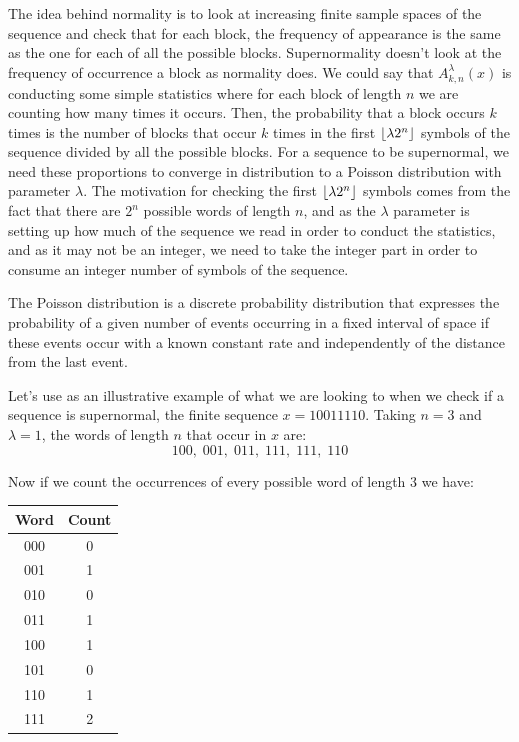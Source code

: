\documentclass[11pt,a4paper]{tesis}
\DeclarePairedDelimiter{\floor}{\lfloor}{\rfloor}
\begin{document}
The idea behind normality is to look at increasing finite sample spaces of the sequence and check that for each block, the frequency of appearance is the same as the one for each of all the possible blocks.
Supernormality doesn't look at the frequency of occurrence a block as normality does. We could say that $A^\lambda_{k,n}(x)$ is conducting some simple statistics where for each block of length $n$ we are counting how many times it occurs. 
 Then, the probability that a block occurs $k$ times is the number of blocks that occur $k$ times in the first $\floor{\lambda 2^n}$ symbols of the sequence divided by all the possible blocks.
For a sequence to be supernormal, we need these proportions to converge in distribution to a Poisson distribution with parameter $\lambda$. 
The motivation for checking the first $\floor{\lambda 2^n}$ symbols comes from the fact that there are $2^n$ possible words of length $n$, and as the $\lambda$ parameter is setting up how much of the sequence we read in order to conduct the statistics, and as it may not be an integer, we need to take the integer part in order to consume an integer number of symbols of the sequence.

The Poisson distribution is a discrete probability distribution that expresses the probability of a given number of events occurring in a fixed interval of space if these events occur with a known constant rate and independently of the distance from the last event.


Let's use as an illustrative example of what we are looking to when we check if a sequence is supernormal, the finite sequence $x = 10011110$. Taking $n=3$ and $\lambda = 1$, the words of length $n$ that occur in $x$ are:
$$100, \; 001, \; 011,\; 111,\; 111,\; 110$$

Now if we count the occurrences of every possible word of length $3$ we have:

\begin{center}
    \begin{tabular}{|c | c|} 
    \hline
    Word & Count \\ [0.5ex] 
    \hline
    000 & 0 \\ 
    \hline
    001 & 1 \\ 
    \hline
    010 & 0 \\ 
    \hline
    011 & 1 \\ 
    \hline
    100 & 1 \\ 
    \hline
    101 & 0 \\ 
    \hline
    110 & 1 \\ 
    \hline
    111 & 2 \\ 
    \hline
   \end{tabular}
\end{center}
\end{document}
